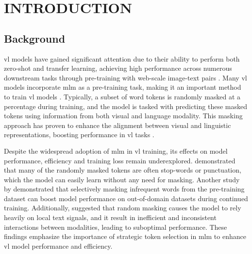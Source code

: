 \setlength{\parindent}{0in}
\setlength{\parskip}{1.5mm}
\setlength{\baselineskip}{1.6em}

\chapter{INTRODUCTION}
\section{Background}
\acrfull{vl} models have gained significant attention due to their ability to perform both zero-shot and transfer learning, achieving high performance across numerous downstream tasks through pre-training with web-scale image-text pairs \cite{s-clip, medclip, vl-review}.
Many \acrshort{vl} models incorporate \acrfull{mlm} as a pre-training task, making it an important method to train \acrshort{vl} models \cite{albef, mplug, uniter, beit-3, lxmert}.
Typically, a subset of word tokens is randomly masked at a percentage during training, and the model is tasked with predicting these masked tokens using information from both visual and language modality.
This masking approach has proven to enhance the alignment between visual and linguistic representations, boosting performance in \acrshort{vl} tasks \cite{lxmert}.

Despite the widespread adoption of \acrshort{mlm} in \acrshort{vl} training, its effects on model performance, efficiency and training loss remain underexplored.
 demonstrated that many of the randomly masked tokens are often stop-words or punctuation, which the model can easily learn without any need for masking.
Another study by  demonstrated that selectively masking infrequent words from the pre-training dataset can boost model performance on out-of-domain datasets during continued training.
Additionally,  suggested that random masking causes the model to rely heavily on local text signals, and it result in inefficient and inconsistent interactions between modalities, leading to suboptimal performance.
These findings emphasize the importance of strategic token selection in \acrshort{mlm} to enhance \acrshort{vl} model performance and efficiency.

